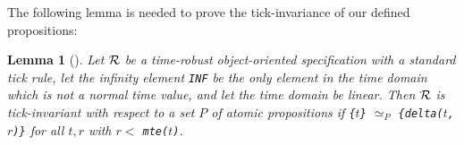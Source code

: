 \documentclass[10pt,journal]{IEEEtran}
\newtheorem{lemma}[theorem]{Lemma}
\begin{document}
The following lemma is needed to prove the tick-invariance of our
defined propositions:
\begin{lemma}[\cite{DBLP:journals/entcs/OlveczkyM07a}]
\label{l:tickinv}
Let $\cal R$ be a time-robust object-oriented specification with a
standard tick rule, let the infinity element \verb|INF| be the only
element in the time domain which is not a normal time value, and let
the time domain be \emph{linear}. Then $\cal R$ is tick-invariant with
respect to a set $P$ of atomic propositions if \verb|{|$t$\verb|}|
$\simeq_P$ \verb|{delta(|$t$\verb|,|$r$\verb|)}| for all $t,r$ with
$r<$ \verb|mte(|$t$\verb|)|.
\end{lemma}

\newcommand{\mteTask}[2]{\texttt{mteTask(}#1\texttt{,}#2\texttt{)}}
\newcommand{\deltaTask}[3]{\texttt{deltaTask(}#1\texttt{,}#2\texttt{,}#3\texttt{)}}
\newcommand{\mteIS}[1]{\texttt{mteIS(}#1\texttt{)}}
\newcommand{\deltaIS}[2]{\texttt{deltaIS(}#1\texttt{,}#2\texttt{)}}
\newcommand{\IntSrc}[3]{\texttt{<}#1\texttt{:IntSrc|val:}#2\texttt{,cycle:}#3\texttt{>}}
\newcommand{\mteIr}[1]{\texttt{mteIr(}#1\texttt{)}}
\newcommand{\mteS}[1]{\texttt{mte(}#1\texttt{)}}
\newcommand{\deltaS}[2]{\texttt{delta(}#1\texttt{,}#2\texttt{)}}
 
\end{document}
